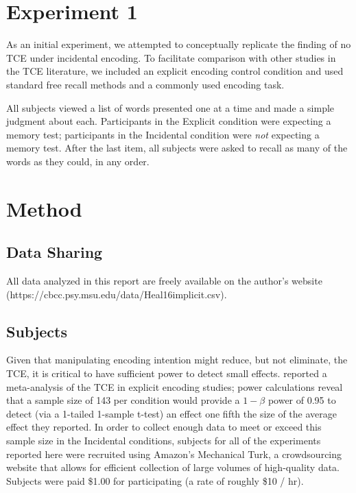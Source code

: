 \documentclass[jou,natbib,floatsintext]{apa6} %
\begin{document}
\section{Experiment 1}
As an initial experiment, we attempted to conceptually replicate the \citet{NairEtal17} finding of no TCE under incidental encoding. To facilitate comparison with other studies in the TCE literature, we included an explicit encoding control condition and used standard free recall methods and a commonly used encoding task. 

All subjects viewed a list of words presented one at a time and made a simple judgment about each. Participants in the Explicit condition were expecting a memory test; participants in the Incidental condition were \emph{not} expecting a memory test.  After the last item, all subjects were asked to recall as many of the words as they could, in any order. 

\section{Method}

\newcommand\listlength{16} %
\newcommand\presrate{4 seconds} %
\newcommand\isi{1 second} %
\newcommand\DFRDelay{16 second} %
\newcommand\recalltime{75 seconds} %
\newcommand\totalss{XX}
\newcommand\totalexcluded{XX}



\subsection{Data Sharing}All data analyzed in this report are freely available on the author's website (https://cbcc.psy.msu.edu/data/Heal16implicit.csv).

\subsection{Subjects}

Given that manipulating encoding intention might reduce, but not eliminate, the TCE, it is critical to have sufficient power to detect small effects. \citet{SedeEtal10} reported a meta-analysis of the TCE in explicit encoding studies; power calculations reveal that a sample size of 143 per condition would provide a $1-\beta$ power of 0.95 to detect (via a 1-tailed 1-sample t-test) an effect one fifth the size of the average effect they reported. 
In order to collect enough data to meet or exceed this sample size in the Incidental conditions, subjects for all of the experiments reported here were recruited using Amazon's Mechanical Turk, a crowdsourcing website that allows for efficient collection of large volumes of high-quality data. Subjects were paid \$1.00 for participating (a rate of roughly \$10 / hr). 
\end{document}
